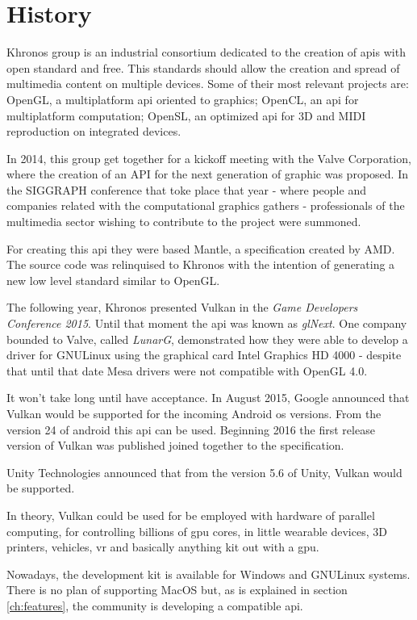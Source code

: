 \chapter{History}
Khronos group is an industrial consortium dedicated to the creation of \gls{api}s with open standard and free. This
standards should allow the creation and spread of multimedia content on multiple devices. Some of their most relevant
projects are: OpenGL, a multiplatform \gls{api} oriented to graphics; OpenCL, an \gls{api} for multiplatform
computation; OpenSL, an optimized \gls{api} for 3D and MIDI reproduction on integrated devices.

In 2014, this group get together for a kickoff meeting with the Valve Corporation, where the creation of an API for the
next generation of graphic was proposed. In the SIGGRAPH conference that toke place that year - where people and
companies related with the computational graphics gathers - professionals of the multimedia sector wishing to
contribute to the project were summoned.

For creating this \gls{api} they were based Mantle, a specification created by AMD. The source code was relinquised
to Khronos with the intention of generating a new low level standard similar to OpenGL.

The following year, Khronos presented Vulkan in the \emph{Game Developers Conference 2015}. Until that moment the
\gls{api} was known as \emph{glNext}. One company bounded to Valve, called \emph{LunarG}, demonstrated how they
were able to develop a driver for GNU\/Linux using the graphical card Intel Graphics HD 4000 - despite that until that
date Mesa drivers were not compatible with OpenGL 4.0.

It won't take long until have acceptance. In August 2015, Google announced that Vulkan would be supported for the
incoming Android \gls{os} versions. From the version 24 of android this \gls{api} can be used. Beginning 2016
the first release version of Vulkan was published joined together to the specification.

Unity Technologies announced that from the version 5.6 of Unity, Vulkan would be supported.

In theory, Vulkan could be used for be employed with hardware of parallel computing, for controlling billions of
\gls{gpu} cores, in little wearable devices, 3D printers, vehicles, \gls{vr} and basically anything kit out with
a \gls{gpu}.

Nowadays, the development kit is available for Windows and GNU\/Linux systems. There is no plan of supporting MacOS but,
as is explained in section \ref{ch:features}, the community is developing a compatible \gls{api}.

